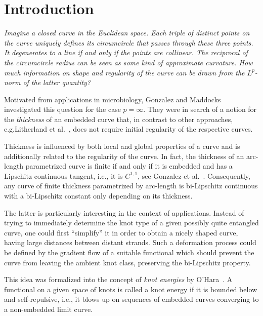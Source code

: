 
\section*{Introduction}

\emph{Imagine a closed curve in the Euclidean space.
Each triple of distinct points on the curve uniquely defines
its {circumcircle} that passes through these three points.
It degenerates to a line if and only if the points are collinear.
The reciprocal of the circumcircle radius can be seen
as some kind of approximate curvature.
How much information on shape and regularity of the curve
can be drawn from the $L^{p}$-norm
of the latter quantity?}

Motivated from applications in microbiology,
Gonzalez and Maddocks~\cite{gonz-madd} investigated
this question for the case $p=\infty$.
They were in search of a notion for the \emph{thickness}
of an embedded curve that, in contrast to
other approaches, e.g.\@ Litherland et al.~\cite{lsdr}, does not require
initial regularity of the respective curves.

Thickness is influenced by both local and global properties of
a curve and is additionally related to the regularity of the curve.
In fact, the thickness of an arc-length parametrized curve
is finite if and only if it is embedded and
has a Lipschitz continuous tangent, i.e., it is $C^{1,1}$,
see Gonzalez et al.~\cite{gmsm}.
Consequently, any curve of finite thickness
parametrized by arc-length
is bi-Lipschitz continuous with a bi-Lipschitz
constant only depending on its thickness.

The latter is particularly interesting in the
context of applications. Instead of
trying to immediately determine the knot type
of a given possibly quite entangled curve, one could first ``simplify'' it
in order to obtain a nicely shaped curve,
having large distances between distant strands.
Such a deformation process could be defined by the gradient flow of a
suitable functional which should prevent the curve
from leaving the ambient knot class,
preserving the bi-Lipschitz property.

This idea was formalized into the concept of
\emph{knot energies} by O'Hara~\cite[Def.~1.1]{oha:en-kn}.
A functional on a given space of knots is
called a {knot energy} if
it is bounded below and self-repulsive,
i.e., it blows up on sequences of embedded curves converging to
a non-embedded limit curve.


